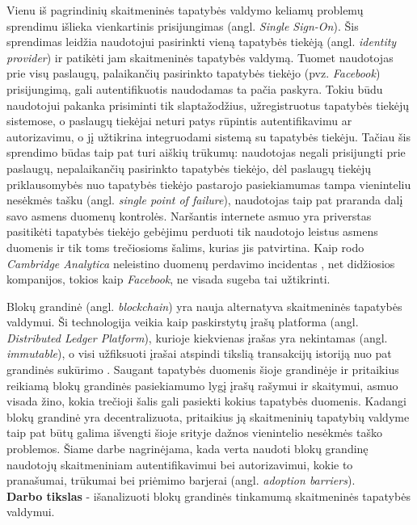 Vienu iš pagrindinių skaitmeninės tapatybės valdymo keliamų problemų sprendimu išlieka vienkartinis prisijungimas
 (angl. \textit{Single Sign-On}). Šis sprendimas leidžia naudotojui pasirinkti
vieną tapatybės tiekėją (angl. \textit{identity provider}) ir patikėti jam skaitmeninės tapatybės valdymą. Tuomet naudotojas prie visų
paslaugų, palaikančių pasirinkto tapatybės tiekėjo (pvz. \textit{Facebook}) prisijungimą, gali autentifikuotis naudodamas ta pačia paskyra. Tokiu
būdu naudotojui pakanka prisiminti tik slaptažodžius, užregistruotus tapatybės tiekėjų sistemose, o paslaugų
tiekėjai neturi patys rūpintis autentifikavimu ar autorizavimu, o jį užtikrina integruodami sistemą
su tapatybės tiekėju. Tačiau šis sprendimo būdas taip pat turi aiškių trūkumų: naudotojas negali prisijungti
prie paslaugų, nepalaikančių pasirinkto tapatybės tiekėjo, dėl paslaugų tiekėjų priklausomybės nuo tapatybės tiekėjo pastarojo pasiekiamumas
tampa vieninteliu nesėkmės tašku (angl. \textit{single point of failure}), naudotojas taip pat praranda dalį savo asmens duomenų kontrolės.
Naršantis internete asmuo yra priverstas pasitikėti tapatybės tiekėjo
gebėjimu perduoti tik naudotojo leistus asmens duomenis ir tik toms trečiosioms šalims, kurias jis patvirtina.
Kaip rodo \textit{Cambridge Analytica} neleistino duomenų perdavimo incidentas \cite{CambridgeAnalytica}, net didžiosios kompanijos, tokios
kaip \textit{Facebook}, ne visada sugeba tai užtikrinti.

Blokų grandinė (angl. \textit{blockchain}) yra nauja alternatyva skaitmeninės tapatybės valdymui. Ši technologija veikia kaip
paskirstytų įrašų platforma (angl. \textit{Distributed Ledger Platform}), kurioje kiekvienas įrašas yra nekintamas (angl. \textit{immutable}), o visi
užfiksuoti įrašai atspindi tikslią transakcijų istoriją nuo pat grandinės sukūrimo \cite{Baars2016}. Saugant tapatybės duomenis šioje grandinėje ir
pritaikius reikiamą blokų grandinės pasiekiamumo lygį įrašų rašymui ir skaitymui, asmuo visada
žino, kokia trečioji šalis gali pasiekti kokius tapatybės duomenis. Kadangi blokų grandinė yra decentralizuota, pritaikius ją skaitmeninių tapatybių valdyme taip pat
būtų galima išvengti šioje srityje dažnos vienintelio nesėkmės taško problemos. Šiame darbe nagrinėjama, kada verta naudoti blokų grandinę
naudotojų skaitmeniniam autentifikavimui bei autorizavimui, kokie to pranašumai, trūkumai bei priėmimo barjerai (angl. \textit{adoption barriers}).
\\

\textbf{Darbo tikslas} - išanalizuoti blokų grandinės tinkamumą skaitmeninės tapatybės valdymui.
\\

